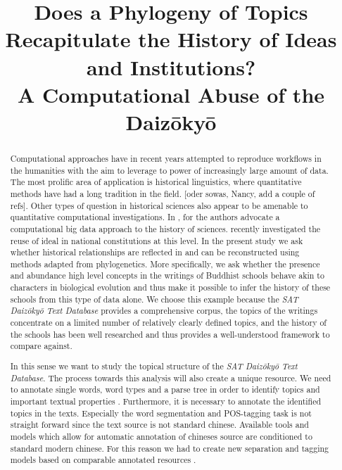 \documentclass[a4paper,10pt]{article}
\title{Does a Phylogeny of Topics Recapitulate the History of Ideas and 
  Institutions? \\
  A Computational Abuse of the Daiz{\=o}ky{\=o}}
\author{}
\newcommand{\TODO}[1]{\begingroup\color{red}#1\endgroup}
\begin{document}
\maketitle

\begin{abstract}
  Computational approaches have in recent years attempted to reproduce
  workflows in the humanities with the aim to leverage to power of
  increasingly large amount of data. The most prolific area of application
  is historical linguistics, where quantitative methods have had a long
  tradition in the field. \TODO{[oder sowas, Nancy, add a couple of
    refs]}. Other types of question in historical sciences also appear to
  be amenable to quantitative computational investigations. In
  \cite{Laubichler:13}, for the authors advocate a computational big data
  approach to the history of sciences. \cite{Rockmore:16} recently
  investigated the reuse of ideal in national constitutions at this
  level. In the present study we ask whether historical relationships are
  reflected in and can be reconstructed using methods adapted from
  phylogenetics. More specifically, we ask whether the presence and
  abundance high level concepts in the writings of Buddhist \TODO{schools}
  behave akin to characters in biological evolution and thus make it
  possible to infer the history of these \TODO{schools} from this type of
  data alone. We choose this example because the \textit{SAT
    Daiz{\=o}ky{\=o} Text Database} \cite{***} provides a comprehensive
  corpus, the topics of the writings concentrate on a limited number of
  relatively clearly defined topics, and the history of the \TODO{schools}
  has been well researched and thus provides a well-understood framework to
  compare against.


  In this sense we want to study the topical structure of the \textit{SAT
    Daiz{\=o}ky{\=o} Text Database}. The process towards this analysis will
  also create a unique resource.  We need to annotate single words, word
  types and a parse tree in order to identify topics and important textual
  properties . Furthermore, it is necessary to annotate the identified
  topics in the texts. Especially the word segmentation and POS-tagging
  task is not straight forward since the text source is not standard
  chinese.  Available tools and models which allow for automatic annotation
  of chineses source are conditioned to standard modern chinese. For this
  reason we had to create new separation and tagging models based on
  comparable annotated resources \cite{Lee14}.



\end{abstract}
\end{document}
